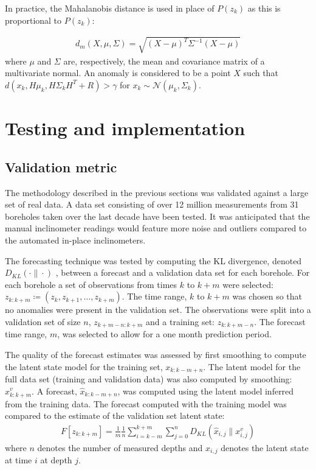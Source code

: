 \documentclass[pamm,a4paper,fleqn]{w-art}
\begin{document}
In practice, the Mahalanobis distance \cite{stats:2008} is used in place of $P(z_k)$ as this is proportional to $P(z_k)$:

\begin{align}
  d_m(X, \mu, \Sigma) = \sqrt{\left( X - \mu \right)^T \Sigma^{-1} \left(X - \mu\right)}
\end{align}
where $\mu$ and $\Sigma$ are, respectively, the mean and covariance matrix of a multivariate normal. An anomaly is considered to be a point $X$ such that $d(x_k, H\mu_k, H\Sigma_kH^T + R) > \gamma$ for $x_k \sim \mathcal{N}\left(\mu_k, \Sigma_k\right)$.

\section{Testing and implementation}
\label{sec:testingandimplementation}

\subsection{Validation metric}

The methodology described in the previous sections was validated against a large set of real data. A data set consisting of over 12 million measurements from 31 boreholes taken over the last decade have been tested. It was anticipated that the manual inclinometer readings would feature more noise and outliers compared to the automated in-place inclinometers.

The forecasting technique was tested by computing the KL divergence, denoted $D_{KL}( \cdot \| \cdot)$ \cite{murphy2012machine}, between a forecast and a validation data set for each borehole. For each borehole a set of observations from times $k$ to $k+m$ were selected: $z_{k:k+m} \coloneqq 
(z_k, z_{k+1}, \dots, z_{k+m})$. The time range, $k$ to $k+m$ was chosen so that no anomalies were present in the validation set. The observations were split into a validation set of size $n$, $z_{k+m-n:k+m}$ and a training set: $z_{k:k+m-n}$. The forecast time range, $m$, was selected to allow for a one month prediction period. 

The quality of the forecast estimates was assessed by first smoothing to compute the latent state model for the training set, $x_{k:k-m+n}$. The latent model for the full data set (training and validation data) was also computed by smoothing: $x^v_{k:k+m}$. A forecast, $\hat{x}_{k:k-m+n}$, was computed using the latent model inferred from the training data. The forecast computed with the training model was compared to the estimate of the validation set latent state:
\begin{align}
  \label{eqn:verificatonmetric}
  F[z_{k:k+m}] = \frac{1}{m}\frac{1}{n}\sum^{k+m}_{i=k-m} \sum^n_{j=0} D_{KL}\left(\hat{x}_{i,j} \| x^v_{i,j} \right)
\end{align}
where $n$ denotes the number of measured depths and $x_{i,j}$ denotes the latent state at time $i$ at depth $j$.
\end{document}
